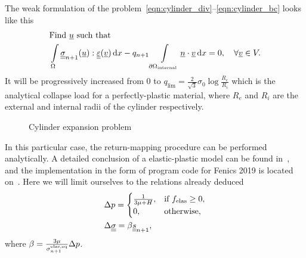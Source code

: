 \documentclass[12pt]{article}
\begin{document}
The weak formulation of the problem~\eqref{eqn:cylinder_div}--\eqref{eqn:cylinder_bc} looks like this
\begin{align}
    & \text{Find } \underline{u} \text{ such that} \label{eqn:cylinder_var_1} \\
    & \int\limits_\Omega\underline{\underline{\sigma}}_{n+1}(\underline{u}) : \underline{\underline{\varepsilon}}(\underline{v}) \, \mathrm{d} x - q_{n+1}\int\limits_{\partial\Omega_\text{internal}}\underline{n} \cdot \underline{v} \, \mathrm{d} x = 0, \quad \forall \underline{v} \in V. \label{eqn:cylinder_var_2}
\end{align}
It will be progressively increased from 0 to $q_\text{lim} = \frac{2}{\sqrt{3}}\sigma_0\log{\frac{R_e}{R_i}}$ which is the analytical collapse load for a perfectly-plastic material, where $R_e$ and $R_i$ are the external and internal radii of the cylinder respectively.

\begin{figure}[H]
    \begin{minipage}[h]{0.5\linewidth}
    \end{minipage}
    \hfill
    \begin{minipage}[h]{0.5\linewidth}
    \end{minipage}
    \caption{Cylinder expansion problem}
    \label{fig:domain}
\end{figure}

In this particular case, the return-mapping procedure can be performed analytically. A detailed conclusion of a elastic-plastic model can be found in~\parencite{bonnet:hal-01083772}, and the implementation in the form of program code for Fenics 2019 is located on~\parencite{bleyer2018numericaltours}. Here we will limit ourselves to the relations already deduced
\begin{align}
    &\Delta p = 
    \begin{cases}
        \frac{1}{3\mu + H}, & \text{if } f_\text{elas} \geq 0,\\
        0, & \text{otherwise},
    \end{cases} \label{eqn:dp_von_mises}\\
    &\Delta\underline{\underline{\sigma}} = \beta\underline{\underline{s}}_{n+1}, \label{eqn:dsigma_von_mises}
\end{align}
where $\beta = \frac{3\mu}{\sigma_{n+1}^\text{elas,eq}}\Delta p$.
\end{document}
